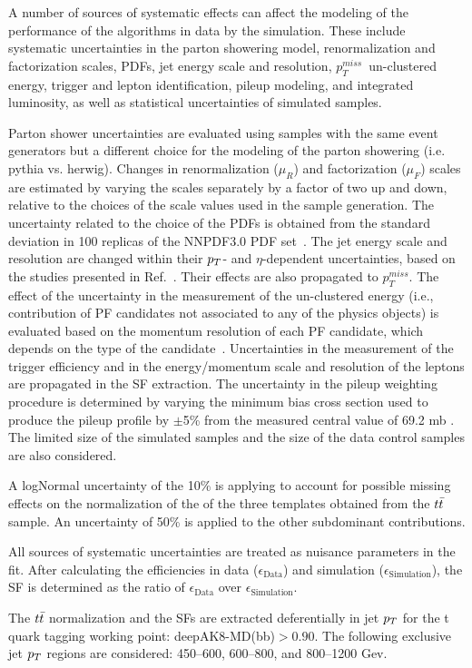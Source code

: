 A number of sources of systematic effects can affect the modeling of the performance of the algorithms in data by the simulation.
These include systematic uncertainties in the parton showering model, renormalization and factorization scales, PDFs, jet energy scale and resolution, $p_{T}^{miss}$\ un-clustered energy, trigger and lepton identification, pileup modeling, and integrated luminosity,
as well as statistical uncertainties of simulated samples.

Parton shower uncertainties are evaluated using samples with the
same event generators but a different choice for the modeling of the
parton showering (i.e. pythia vs. herwig). 
Changes in renormalization ($\mu_{R}$) and factorization ($\mu_{F}$) scales are estimated by varying the scales separately by a factor of two up and down,
relative to the choices of the scale values used
in the sample generation. The uncertainty related to the choice of the
PDFs is obtained from the standard deviation in 100 replicas of the
NNPDF3.0 PDF set~\cite{Ball:2012cx}.
The jet energy scale and resolution are changed within their $p_{T}$-
and $\eta$-dependent uncertainties, based on the studies presented in
Ref.~\cite{Khachatryan:2016kdb}. Their effects are also propagated to
$p_{T}^{miss}$.
The effect of the uncertainty in the measurement of the un-clustered
energy (i.e., contribution of PF candidates not associated to any of
the physics objects) is evaluated based on the momentum resolution of
each PF candidate, which depends on the type of the
candidate~\cite{Sirunyan:2019kia}.
Uncertainties in the measurement of the trigger efficiency and in the
energy/momentum scale and resolution of the leptons are propagated in the SF extraction.
The uncertainty in the pileup weighting procedure is determined by
varying the minimum bias cross section used to produce the pileup
profile by $\pm$5\% from the measured central value of 69.2 mb
\cite{Sirunyan:2018nqx,Aaboud:2016mmw}.
The limited size of the simulated samples and the size of the data
control samples are also considered.

A logNormal uncertainty of the 10\% is applying to account for possible missing effects on the normalization of the of the three templates obtained from the $t\bar{t} $ sample. An uncertainty of 50\% is applied to the other subdominant contributions.    

 All sources of systematic uncertainties are treated as nuisance parameters in the fit.  After calculating the efficiencies in data ($\epsilon_{\text{Data}}$)
and simulation ($\epsilon_{\text{Simulation}}$), the SF is
determined as the ratio of $\epsilon_{\text{Data}}$ over $\epsilon_{\text{Simulation}}$.

The $t\bar{t} $ normalization and the SFs are extracted deferentially in jet $p_{T}$ for the t quark tagging working point: deepAK8-MD(bb)$>0.90$. The following exclusive jet $p_{T}$ regions
are considered: 450--600, 600--800, and 800--1200 Gev.